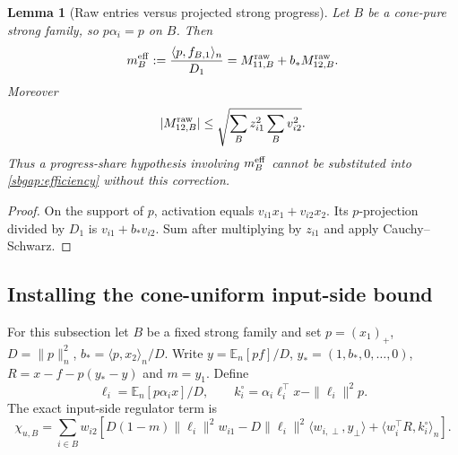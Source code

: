 \documentclass{article} %
\theoremstyle{plain}
\newtheorem{lemma}[theorem]{Lemma}
\theoremstyle{definition}
\theoremstyle{remark}
\begin{document}
\begin{lemma}[Raw entries versus projected strong progress]
\label{sbgap:progress}
Let $B$ be a cone-pure strong family, so $p\alpha_i=p$ on $B$. Then
\[
 m_B^{\rm eff}:=\frac{\langle p,f_{B,1}\rangle_n}{D_1}
   =M_{11,B}^{\rm raw}+b_*M_{12,B}^{\rm raw}.
\]
Moreover
\[
 |M_{12,B}^{\rm raw}|
 \le\sqrt{\sum_B z_{i1}^2\sum_B v_{i2}^2}.
\]
Thus a progress-share hypothesis involving $m_B^{\rm eff}$ cannot be
substituted into \eqref{sbgap:efficiency} without this correction.
\end{lemma}
\begin{proof}
On the support of $p$, activation equals $v_{i1}x_1+v_{i2}x_2$.
Its $p$-projection divided by $D_1$ is $v_{i1}+b_*v_{i2}$.
Sum after multiplying by $z_{i1}$ and apply Cauchy--Schwarz.
\end{proof}

\subsection{Installing the cone-uniform input-side bound}

For this subsection let $B$ be a fixed strong family and set
$p=(x_1)_+$, $D=\|p\|_n^2$, $b_*=\langle p,x_2\rangle_n/D$.
Write $y=\mathbb E_n[p f]/D$, $y_*=(1,b_*,0,\ldots,0)$,
$R=x-f-p(y_*-y)$ and $m=y_1$. Define
\[
 \ell_i=\mathbb E_n[p\alpha_i x]/D,\qquad
 k_i^\circ=\alpha_i\ell_i^\top x-\|\ell_i\|^2p.
\]
The exact input-side regulator term is
\[
 \chi_{u,B}=\sum_{i\in B}w_{i2}
 \left[D(1-m)\|\ell_i\|^2w_{i1}
 -D\|\ell_i\|^2\langle w_{i,\perp},y_\perp\rangle
 +\langle w_i^\top R,k_i^\circ\rangle_n\right].
\]
\end{document}

